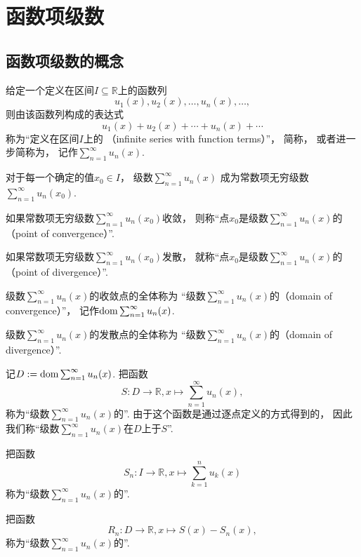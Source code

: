 \section{函数项级数}
\subsection{函数项级数的概念}
\begin{definition}\label{definition:无穷级数.实函数项级数的概念}
给定一个定义在区间\(I \subseteq \mathbb{R}\)上的函数列\[
	u_1(x),u_2(x),\dotsc,u_n(x),\dotsc,
\]
则由该函数列构成的表达式\[
	u_1(x)+u_2(x)+\dotsb+u_n(x)+\dotsb
\]
称为“定义在区间\(I\)上的
（infinite series with function terms）”，
简称，
或者进一步简称为，
记作\(\sum_{n=1}^\infty u_n(x)\).

对于每一个确定的值\(x_0 \in I\)，
级数\(\sum_{n=1}^\infty u_n(x)\)
成为常数项无穷级数\(\sum_{n=1}^\infty u_n(x_0)\).

如果常数项无穷级数\(\sum_{n=1}^\infty u_n(x_0)\)收敛，
则称“点\(x_0\)是级数\(\sum_{n=1}^\infty u_n(x)\)的
（point of convergence）”.

如果常数项无穷级数\(\sum_{n=1}^\infty u_n(x_0)\)发散，
就称“点\(x_0\)是级数\(\sum_{n=1}^\infty u_n(x)\)的
（point of divergence）”.

级数\(\sum_{n=1}^\infty u_n(x)\)的收敛点的全体称为
“级数\(\sum_{n=1}^\infty u_n(x)\)的（domain of convergence）”，
记作\(\operatorname{dom} \sum_{n=1}^\infty u_n(x)\).

级数\(\sum_{n=1}^\infty u_n(x)\)的发散点的全体称为
“级数\(\sum_{n=1}^\infty u_n(x)\)的（domain of divergence）”.

记\(D := \operatorname{dom}\sum_{n=1}^\infty u_n(x)\).
把函数\[
	S\colon D\to\mathbb{R},
	x \mapsto \sum_{n=1}^\infty u_n(x),
\]称为“级数\(\sum_{n=1}^\infty u_n(x)\)的”.
由于这个函数是通过逐点定义的方式得到的，
因此我们称“级数\(\sum_{n=1}^\infty u_n(x)\)在\(D\)上于\(S\)”.

把函数\[
	S_n\colon I\to\mathbb{R},
	x \mapsto \sum_{k=1}^n u_k(x)
\]称为“级数\(\sum_{n=1}^\infty u_n(x)\)的”.

把函数\[
	R_n\colon D\to\mathbb{R},
	x \mapsto S(x) - S_n(x),
\]称为“级数\(\sum_{n=1}^\infty u_n(x)\)的”.
\end{definition}

